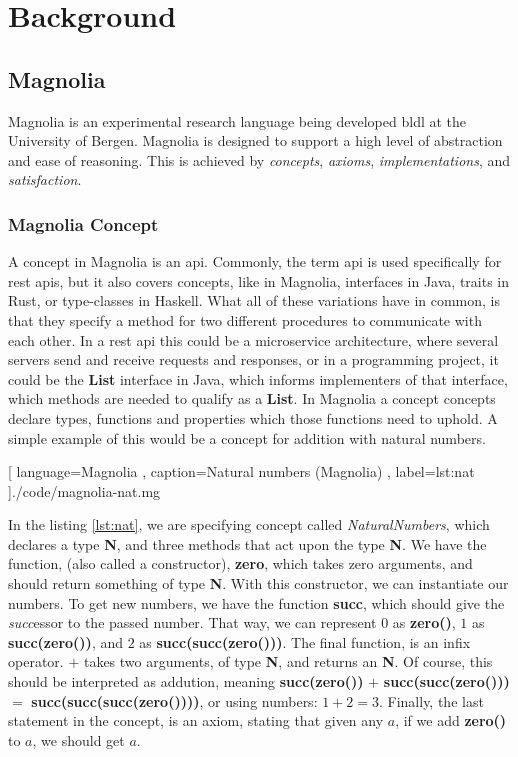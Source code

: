 \chapter{Background} \label{cha:background}

\section{Magnolia}

Magnolia is an experimental research language being developed \gls{bldl} at the
University of Bergen. Magnolia is designed to support a high level of
abstraction and ease of reasoning. This is achieved by \textit{concepts},
\textit{axioms}, \textit{implementations}, and \textit{satisfaction}.

\subsection{Magnolia Concept}

A concept in Magnolia is an \gls{api}. Commonly, the term \gls{api} is used
specifically for \gls{rest} \gls{api}s, but it also covers concepts, like in
Magnolia, interfaces in Java, traits in Rust, or type-classes in Haskell. What
all of these variations have in common, is that they specify a method for two
different procedures to communicate with each other.  In a \gls{rest} \gls{api}
this could be a microservice architecture, where several servers send and
receive requests and responses, or in a programming project, it could be the
\textbf{List} interface in Java, which informs implementers of that interface,
which methods are needed to qualify as a \textbf{List}. In Magnolia a concept
concepts declare types, functions and properties which those functions need to
uphold. A simple example of this would be a concept for addition with natural numbers.

\begin{center}
  
    [ language=Magnolia
    , caption={Natural numbers (Magnolia)}
    , label=lst:nat
    ]{./code/magnolia-nat.mg}
\end{center}

In the listing \ref{lst:nat}, we are specifying concept called
\textit{NaturalNumbers}, which declares a type \textbf{N}, and three methods
that act upon the type \textbf{N}. We have the function, (also called a
constructor), \textbf{zero}, which takes zero arguments, and should return
something of type \textbf{N}. With this constructor, we can instantiate our
numbers. To get new numbers, we have the function \textbf{succ}, which should
give the \textit{succ}essor to the passed number. That way, we can represent $0$
as \textbf{zero()}, $1$ as \textbf{succ(zero())}, and $2$ as
\textbf{succ(succ(zero()))}. The final function, is an infix operator. $+$ takes
two arguments, of type \textbf{N}, and returns an \textbf{N}. Of course, this
should be interpreted as addution, meaning \textbf{succ(zero())} $+$
\textbf{succ(succ(zero()))} $=$ \textbf{succ(succ(succ(zero())))}, or using
numbers: $1 + 2 = 3$. Finally, the last statement in the concept, is an axiom,
stating that given any $a$, if we add \textbf{zero()} to $a$, we should get $a$.

